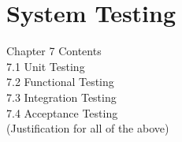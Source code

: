 
\chapter{System Testing}\thispagestyle{thesisstyle} %
\graphicspath{{Chapter6/}}
{

Chapter 7 Contents\\
7.1 Unit Testing\\
7.2 Functional Testing\\
7.3 Integration Testing\\
7.4 Acceptance Testing\\
(Justification for all of the above)


















}


